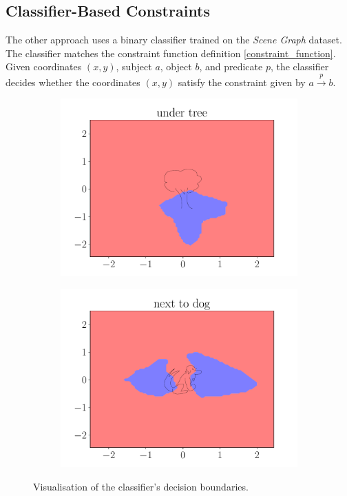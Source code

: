 \subsection{Classifier-Based Constraints}
\label{sec:classifier_based_constraints}

The other approach uses a binary classifier trained on the \emph{Scene Graph} \citep{xu2017scenegraph}\break dataset. The classifier matches the constraint function definition \ref{constraint_function}. Given coordinates $(x, y)$, subject $a$, object $b$, and predicate $p$, the classifier decides whether the coordinates $(x, y)$ satisfy the constraint given by $a \xrightarrow{p} b$.

\begin{figure}[ht]
    \centering
    \begin{subfigure}{0.45\textwidth}
        \centering
        \includegraphics[width=\textwidth]{figures/under_tree}
    \end{subfigure}
    \begin{subfigure}{0.45\textwidth}
        \centering
        \includegraphics[width=\textwidth]{figures/next_to_dog}
    \end{subfigure}
    \caption[Visualisation of the classifier's decision boundaries]{Visualisation of the classifier's decision boundaries.}
    \label{fig:boundaries:1}
\end{figure}

